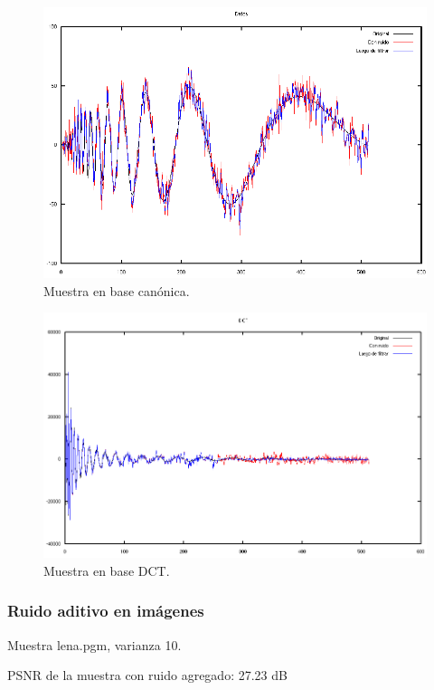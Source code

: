 \documentclass[a4paper,10pt,twoside]{article}
\begin{document}
\begin{figure}[H]
  \centering
  \includegraphics[width=15cm]{graficos/dopp_aditivo_atenuar_muestra.png}
  \caption{Muestra en base canónica.}
\end{figure}

\begin{figure}[H]
  \centering
  \includegraphics[width=15cm]{graficos/dopp_aditivo_atenuar_dct.png} 
  \caption{Muestra en base DCT.}
\end{figure}


\subsubsection{Ruido aditivo en imágenes}

Muestra lena.pgm, varianza 10.

PSNR de la muestra con ruido agregado: 27.23 dB
\end{document}
